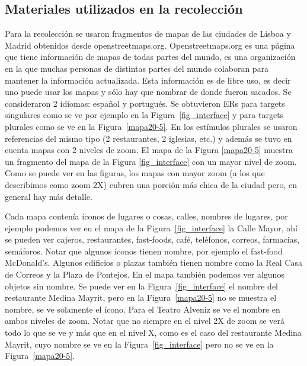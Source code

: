 \subsection{Materiales utilizados en la recolecci\'on}
\label{corpus-materiales}

Para la recolecci\'on se usaron fragmentos de mapas de las ciudades de Lisboa y Madrid obtenidos desde openstreetmaps.org. Openstreetmaps.org es una p\'agina que tiene informaci\'on de mapas de todas partes del mundo, es una organizaci\'on en la que muchas personas de distintas partes del mundo colaboran para mantener la informaci\'on actualizada. Esta informaci\'on es de libre uso, es decir uno puede usar los mapas y s\'olo hay que nombrar de donde fueron sacados.
Se consideraron 2 idiomas: espa\~nol y portugu\'es. Se obtuvieron ERs para targets singulares como se ve por ejemplo en la Figura~\ref{fig_interface} y para targets plurales como se ve en la Figura~\ref{mapa20-5}. En los est\'imulos plurales se usaron referencias del mismo tipo (2 restaurantes, 2 iglesias, etc.) y adem\'as se tuvo en cuenta mapas con 2 niveles de zoom. El mapa de la Figura \ref{mapa20-5} muestra un fragmento del mapa de la Figura \ref{fig_interface} con un mayor nivel de zoom. Como se puede ver en las figuras, los mapas con mayor zoom (a los que describimos como zoom 2X) cubren una porci\'on m\'as chica de la ciudad pero, en general hay m\'as detalle.

Cada mapa conten\'ia \'iconos de lugares o cosas, calles, nombres de lugares, por ejemplo podemos ver en el mapa de la Figura~\ref{fig_interface} la Calle Mayor, ah\'i se pueden ver cajeros, restaurantes, fast-foods, caf\'e, tel\'efonos, correos, farmacias, sem\'aforos. Notar que algunos \'iconos tienen nombre, por ejemplo el fast-food McDonald's. Algunos edificios o plazas tambi\'en tienen nombre como la Real Casa de Correos y la Plaza de Pontejos. En el mapa tambi\'en podemos ver algunos objetos sin nombre.
Se puede ver en la Figura~\ref{fig_interface} el nombre del restaurante Medina Mayrit, pero en la Figura~\ref{mapa20-5} no se muestra el nombre, se ve solamente el \'icono. Para el Teatro Alveniz se ve el nombre en ambos niveles de zoom. Notar que no siempre en el nivel 2X de zoom se ver\'a todo lo que se ve y m\'as que en el nivel X, como es el caso del restaurante Medina Mayrit, cuyo nombre se ve en la Figura~\ref{fig_interface} pero no se ve en la Figura~\ref{mapa20-5}.

